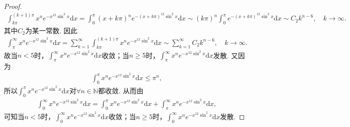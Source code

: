 \documentclass[../../main.tex]{subfiles}
\begin{document}
\begin{proof}
\begin{align*}
\int_{k\pi}^{(k+1)\pi}x^ne^{-x^{12}\sin^2x}\mathrm{d}x=\int_0^{\pi}(x+k\pi)^ne^{-(x+k\pi)^{12}\sin^2x}\mathrm{d}x\sim (k\pi)^n\int_0^{\pi}e^{-(x+k\pi)^{12}\sin^2x}\mathrm{d}x\sim C_2k^{n-6},\quad k\rightarrow \infty.
\end{align*}
其中$C_2$为某一常数. 因此
\begin{align*}
\int_{\pi}^{\infty}x^ne^{-x^{12}\sin^2x}\mathrm{d}x=\sum_{k=1}^{\infty}\int_{k\pi}^{(k+1)\pi}x^ne^{-x^{12}\sin^2x}\mathrm{d}x\sim \sum_{k=1}^{\infty}C_2k^{n-6},\quad k\rightarrow \infty.
\end{align*}
故当$n<5$时，$\int_{\pi}^{\infty}x^ne^{-x^{12}\sin^2x}\mathrm{d}x$收敛；当$n\geqslant 5$时，$\int_{\pi}^{\infty}x^ne^{-x^{12}\sin^2x}\mathrm{d}x$发散. 又因为
\begin{align*}
\int_0^{\pi}x^ne^{-x^{12}\sin^2x}\mathrm{d}x\leqslant \pi^n,
\end{align*}
所以$\int_0^{\pi}x^ne^{-x^{12}\sin^2x}\mathrm{d}x$对$\forall n\in \mathbb{N}$都收敛. 从而由
\begin{align*}
\int_0^{\infty}x^ne^{-x^{12}\sin^2x}\mathrm{d}x=\int_0^{\pi}x^ne^{-x^{12}\sin^2x}\mathrm{d}x+\int_{\pi}^{\infty}x^ne^{-x^{12}\sin^2x}\mathrm{d}x,
\end{align*}
可知当$n<5$时，$\int_0^{\infty}x^ne^{-x^{12}\sin^2x}\mathrm{d}x$收敛；当$n\geqslant 5$时，$\int_0^{\infty}x^ne^{-x^{12}\sin^2x}\mathrm{d}x$发散.
\end{proof}
\end{document}

